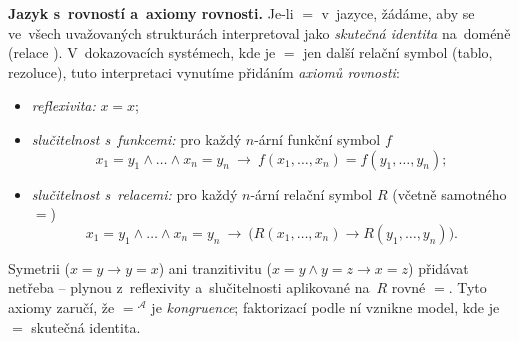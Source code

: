 \documentclass[11pt,a4paper]{article}
\begin{document}
\begin{poznamka}
\textbf{Jazyk s~rovností a~axiomy rovnosti.} Je-li $=$ v~jazyce, žádáme, aby se ve~všech uvažovaných strukturách interpretoval jako \emph{skutečná identita} na~doméně (relace ). V~dokazovacích systémech, kde je $=$ jen další relační symbol (tablo, rezoluce), tuto interpretaci vynutíme přidáním \emph{axiomů rovnosti}:
\begin{itemize}
  \item \emph{reflexivita:} $x=x$;
  \item \emph{slučitelnost s~funkcemi:} pro každý $n$-ární funkční symbol $f$
    \[ x_1=y_1\wedge\dots\wedge x_n=y_n\ \to\ f(x_1,\dots,x_n)=f(y_1,\dots,y_n); \]
  \item \emph{slučitelnost s~relacemi:} pro každý $n$-ární relační symbol $R$ (včetně samotného $=$)
    \[ x_1=y_1\wedge\dots\wedge x_n=y_n\ \to\ \big(R(x_1,\dots,x_n)\to R(y_1,\dots,y_n)\big). \]
\end{itemize}
Symetrii ($x=y\to y=x$) ani tranzitivitu ($x=y\wedge y=z\to x=z$) přidávat netřeba -- plynou z~reflexivity a~slučitelnosti aplikované na~$R$ rovné $=$. Tyto axiomy zaručí, že $={}^{\mathcal A}$ je \emph{kongruence}; faktorizací podle ní vznikne model, kde je $=$ skutečná identita.
\end{poznamka}
\end{document}
